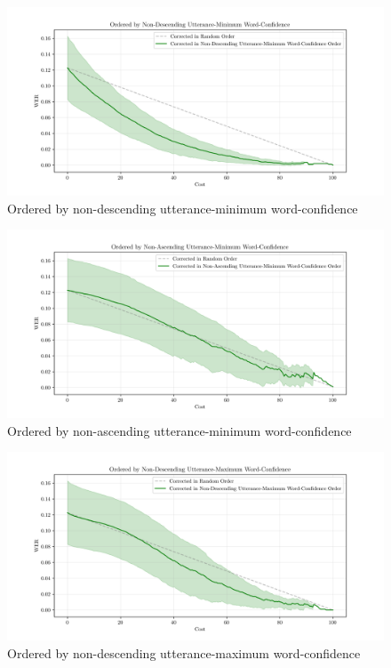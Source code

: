 \begin{figure}[h!]
 \caption{Ordered by non-descending utterance-minimum word-confidence}
 \label{fig:word-conf-comparison-plot1}
 \includegraphics[width=\textwidth]{figures/word-conf-comparison-plot1.png}
 \centering
\end{figure}
\begin{figure}[h!]
 \caption{Ordered by non-ascending utterance-minimum word-confidence}
 \label{fig:word-conf-comparison-plot2}
 \includegraphics[width=\textwidth]{figures/word-conf-comparison-plot2.png}
 \centering
\end{figure}
\begin{figure}[p]
 \caption{Ordered by non-descending utterance-maximum word-confidence}
 \label{fig:word-conf-comparison-plot3}
 \includegraphics[width=\textwidth]{figures/word-conf-comparison-plot3.png}
 \centering
\end{figure}
